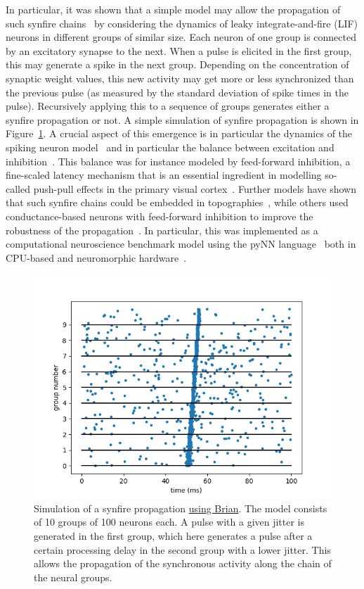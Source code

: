 \documentclass[brainsci, %
               review,submit,pdftex,moreauthors
               ]{Definitions/mdpi}
\begin{document}
In particular, it was shown that a simple model may allow the propagation of such synfire chains~\citep{gewaltig_propagation_2001} by considering the dynamics of leaky integrate-and-fire (LIF) neurons in different groups of similar size. Each neuron of one group is connected by an excitatory synapse to the next. When a pulse is elicited in the first group, this may generate a spike in the next group. Depending on the concentration of synaptic weight values, this new activity may get more or less synchronized than the previous pulse (as measured by the standard deviation of spike times in the pulse). Recursively applying this to a sequence of groups generates either a synfire propagation or not. A simple simulation of synfire propagation is shown in Figure~\ref{fig:diesman}. A crucial aspect of this emergence is in particular the dynamics of the spiking neuron model~\citep{gerstner_time_1995} and in particular the balance between excitation and inhibition~\citep{azouz_stimulus-selective_2008}. This balance was for instance modeled by feed-forward inhibition, a fine-scaled latency mechanism that is an essential ingredient in modelling so-called push-pull effects in the primary visual cortex~\citep{kremkow_push-pull_2016}. Further models have shown that such synfire chains could be embedded in topographies~\citep{aviel_embedding_2003}, while others used conductance-based neurons with feed-forward inhibition to improve the robustness of the propagation~\citep{kremkow_functional_2010}. In particular, this was implemented as a computational neuroscience benchmark model using the pyNN language~\citep{davison_pynn_2008} both in CPU-based and neuromorphic hardware~\citep{pfeil_six_2013}. %
%
\begin{figure}
\centering
\includegraphics[width=.4\textwidth]{figures/Diesmann_et_al_1999.png}
\caption{Simulation of a synfire propagation \href{https://brian2.readthedocs.io/en/stable/examples/frompapers.Diesmann_et_al_1999.html}{using Brian}. The model consists of 10 groups of 100 neurons each. A pulse with a given jitter is generated in the first group, which here generates a pulse after a certain processing delay in the second group with a lower jitter. This allows the propagation of the synchronous activity along the chain of the neural groups.}\label{fig:diesman}
\end{figure}
\end{document}
